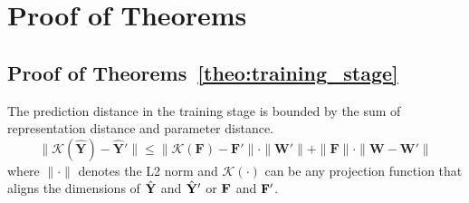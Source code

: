 \appendix
\section{Proof of Theorems}
\label{app:propositions}

    




\subsection{Proof of Theorems~\ref{theo:training_stage}}
\label{app:proof_training_stage}
\begin{theorem-nonumber}
    The prediction distance in the training stage is bounded by the sum of representation distance and parameter distance.
    \begin{equation}
    \| \mathcal{K}(\hat{\mathbf{Y}}) - \hat{\mathbf{Y}}' \| 
    \leq  \| \mathcal{K}(\mathbf{F}) - \mathbf{F}' \| \cdot \| \mathbf{W}' \| + \| \mathbf{F} \| \cdot \| \mathbf{W} - \mathbf{W}' \|
    \end{equation}
    where $\|\cdot\|$ denotes the L2 norm and $\mathcal{K}(\cdot)$ can be any projection function that aligns the dimensions of $\hat{{\bf Y}}$ and $\hat{{\bf Y}}'$ or ${\bf F}$ and ${\bf F}'$.
\end{theorem-nonumber}

